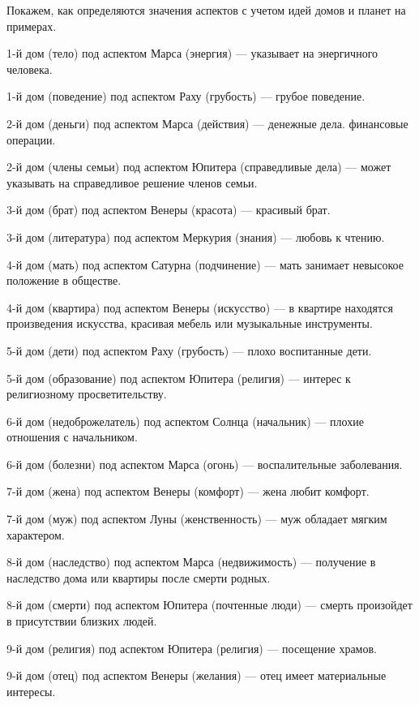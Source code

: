 Покажем, как определяются значения аспектов с учетом идей домов и планет на примерах.
\begin{myitem}
	\item 1-й дом (тело) под аспектом Марса (энергия) --- указывает на энергичного человека.
	\item 1-й дом (поведение) под аспектом Раху (грубость) --- грубое поведение.
	\item 2-й дом (деньги) под аспектом Марса (действия) --- денежные дела. финансовые операции.
	\item 2-й дом (члены семьи) под аспектом Юпитера (справедливые дела) --- может указывать на справедливое решение членов семьи.
	\item 3-й дом (брат) под аспектом Венеры (красота) --- красивый брат.
	\item 3-й дом (литература) под аспектом Меркурия (знания) --- любовь к чтению.
	\item 4-й дом (мать) под аспектом Сатурна (подчинение) --- мать занимает невысокое положение в обществе.
	\item 4-й дом (квартира) под аспектом Венеры (искусство) --- в квартире находятся произведения искусства, красивая мебель или музыкальные инструменты.
	\item 5-й дом (дети) под аспектом Раху (грубость) --- плохо воспитанные дети.
	\item 5-й дом (образование) под аспектом Юпитера (религия) --- интерес к религиозному просветительству.
	\item 6-й дом (недоброжелатель) под аспектом Солнца (начальник) --- плохие отношения с начальником.
	\item 6-й дом (болезни) под аспектом Марса (огонь) --- воспалительные заболевания.
	\item 7-й дом (жена) под аспектом Венеры (комфорт) --- жена любит комфорт.
	\item 7-й дом (муж) под аспектом Луны (женственность) --- муж обладает мягким характером.
	\item 8-й дом (наследство) под аспектом Марса (недвижимость) --- получение в наследство дома или квартиры после смерти родных.
	\item 8-й дом (смерти) под аспектом Юпитера (почтенные люди) --- смерть произойдет в присутствии близких людей.
	\item 9-й дом (религия) под аспектом Юпитера (религия) --- посещение храмов.
	\item 9-й дом (отец) под аспектом Венеры (желания) --- отец имеет материальные интересы.

\end{myitem}

